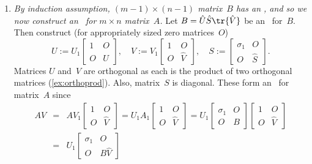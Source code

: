 \begin{enumerate}
\item \emph{By induction assumption, \((m-1)\times(n-1)\) matrix~\(B\) has an \svd, and so we now construct an \svd\ for \(m\times n\) matrix~\(A\).}
Let \(B=\hat U\hat S\tr{\hat V}\) be an \svd\ for~\(B\).
Then construct (for appropriately sized zero matrices~\(O\))
\begin{equation*}
U:=U_1\begin{bmatrix} 1&O\\O&\hat U \end{bmatrix},\quad
V:=V_1\begin{bmatrix} 1&O\\O&\hat V\end{bmatrix},\quad
S:=\begin{bmatrix} \sigma_1&O\\O&\hat S \end{bmatrix}.
\end{equation*}
Matrices \(U\) and~\(V\) are orthogonal as each is the product of two orthogonal matrices (\cref{ex:orthoprod}).
Also, matrix~\(S\) is diagonal.
These form an \svd\ for matrix~\(A\) since
\begin{eqnarray*}
AV&=&AV_1\begin{bmatrix} 1&O\\O&\hat V\end{bmatrix}
=U_1A_1\begin{bmatrix} 1&O\\O&\hat V\end{bmatrix}
=U_1\begin{bmatrix} \sigma_1&O \\O&B \end{bmatrix}\begin{bmatrix} 1&O\\O&\hat V\end{bmatrix}
\\&=&U_1\begin{bmatrix} \sigma_1&O \\O&B\hat V \end{bmatrix}

\end{eqnarray*}
\end{enumerate}

